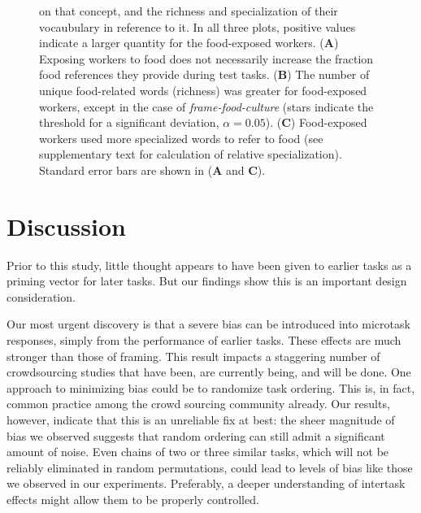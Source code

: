 \documentclass{pnastwo}
\begin{document}
\begin{article}
\begin{figure}[h]
{		on that concept, and the richness and specialization of their 
		vocaubulary in reference to it.
		In all three plots, positive values indicate a larger quantity for 
		the food-exposed workers.
		(\textbf{A}) Exposing workers to food does not necessarily increase
		the fraction food references they provide during test tasks.
		(\textbf{B}) The number of unique food-related
		words (richness) was greater for food-exposed workers, except in the 
		case of \textit{frame-food-culture} (stars indicate the threshold
		for a significant deviation, $\alpha=0.05$). 
		(\textbf{C}) Food-exposed
		workers used more specialized words to refer to food (see 
		supplementary text for calculation of relative specialization).
		Standard error bars are shown in (\textbf{A} and \textbf{C}).
	}
	\label{fig:specificity}
\end{figure}

\section{Discussion}

Prior to this study, little thought appears to have been given to earlier tasks
as a priming vector for later tasks.  But our findings show this is an
important design consideration. 

Our most urgent discovery is that a severe bias can be introduced into
microtask responses, simply from the performance of earlier tasks.  These
effects are much stronger than those of framing. This result impacts a
staggering number of crowdsourcing studies that have been, are currently being,
and will be done.  One approach to minimizing bias could be to randomize task
ordering. This is, in fact, common practice among the crowd sourcing
community already.  Our results, however, indicate that this is an unreliable fix
at best: the sheer magnitude of bias we observed suggests that random ordering
can still admit a significant amount of noise.  Even chains of two or three
similar tasks, which will not be reliably eliminated in random permutations,
could lead to levels of bias like those we observed in our experiments.
Preferably, a deeper understanding of intertask effects might allow them to be
properly controlled.


\end{article}
\end{document}
